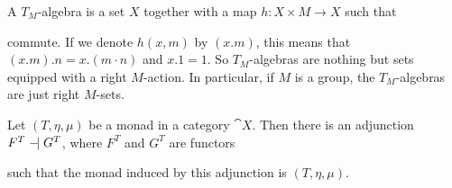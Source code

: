 \begin{example}
    A $T_M$-algebra is a set $X$ together with a map $h \colon X \times M \to X$
    such that 
    \begin{figure}[H]
        \centering
        \begin{subfigure}{0.4\textwidth}
        \centering
        \end{subfigure}
        \hspace{2em}
        \begin{subfigure}{0.4\textwidth}
        \centering
        \end{subfigure}
        \end{figure}
        commute. If we denote $h(x,m)$ by $(x . m)$, this means that
        $(x . m) . n = x . (m \cdot n)$ and $x . 1 = 1$.
        So $T_M$-algebras are nothing but sets equipped with a right $M$-action.
        In particular, if $M$ is a group, the $T_M$-algebras are just right $M$-sets.
\end{example}
\begin{theorem}
    Let $(T,\eta,\mu)$ be a monad in a category $\cat{X}$.
    Then there is an adjunction $F^T \mathrel{-} \mathrel{\mkern-3.5mu} \mathrel{|} G^T$, where $F^T$ and $G^T$ are functors
    such that the monad induced by this adjunction is $(T,\eta,\mu)$.
\end{theorem}
